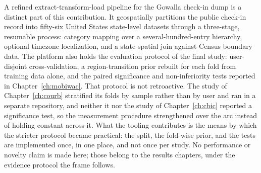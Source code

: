 A refined extract-transform-load pipeline for the Gowalla check-in dump is a
distinct part of this contribution. It geospatially partitions the public check-in
record into fifty-six United States state-level datasets through a three-stage,
resumable process: category mapping over a several-hundred-entry hierarchy, optional
timezone localization, and a state spatial join against Census boundary data. The
platform also holds the evaluation protocol of the final study: user-disjoint
cross-validation, a region-transition prior rebuilt for each fold from training data
alone, and the paired significance and non-inferiority tests reported in
Chapter~\ref{ch:mobiwac}. That protocol is not retroactive. The study of
Chapter~\ref{ch:courb} stratified its folds by sample rather than by user and ran in a
separate repository, and neither it nor the study of Chapter~\ref{ch:cbic} reported a
significance test, so the measurement procedure strengthened over the arc instead of
holding constant across it. What the tooling contributes is the means by which the
stricter protocol became practical: the split, the fold-wise prior, and the tests are
implemented once, in one place, and not once per study. No
performance or novelty claim is made here; those belong to the results chapters, under
the evidence protocol the frame follows.
